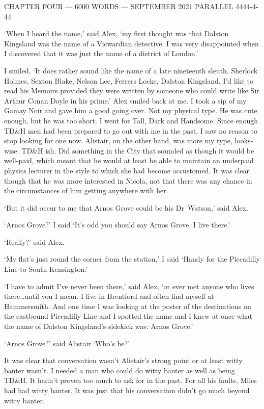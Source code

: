 {\parindent=0pt {\obeylines
{\twelvess CHAPTER FOUR --- 6000 WORDS --- SEPTEMBER 2021}
{\twelvess PARALLEL 4444-4-44}}
\vskip 1cm

\twelverm
`When I heard the name,' said Alex, `my first thought was that
Dalston Kingsland was the name of a Vicwardian detective. I was very
disappointed when I discovered that it was just the name of a
district of London.'}

I smiled. `It does rather sound like the name of a late nineteenth
sleuth. Sherlock Holmes, Sexton Blake, Nelson Lee, Ferrers Locke,
Dalston Kingsland. I'd like to read his {\twelvesl Memoirs\/}
provided they were written by someone who could write like Sir
Arthur Conan Doyle in his prime.' Alex smiled back at me. I took a
sip of my Gamay Noir and gave him a good going over. Not my physical
type. He was cute enough, but he was too short. I went for Tall,
Dark and Handsome. Since enough TD{\&}H men had been prepared to go
out with me in the past, I saw no reason to stop looking for one
now. Alistair, on the other hand, was more my type, looks-wise.
TD{\&}H {\twelveit ish}. Did something in the City that sounded as
though it would be well-paid, which meant that he would at least be
able to maintain an underpaid physics lecturer in the style to which
she had become accustomed. It was clear though that he was more interested in Nicola, not that there was any chance in the circumstances of him getting anywhere with her.

`But it did occur to me that Arnos Grove could be his Dr~Watson,'
said Alex.

`Arnos Grove?' I said `It's odd you should say Arnos Grove. I live
there.'

`Really?' said Alex.

`My flat's just round the corner from the station,' I said `Handy
for the Piccadilly Line to South Kensington.'

`I have to admit I've never been there,' said Alex, `or ever met
anyone who lives there\dots until you I mean. I live in Brentford
and often find myself at Hammersmith. And one time I was looking at
the poster of the destinations on the eastbound Piccadilly Line and
I spotted the name and I knew at once what the name of Dalston
Kingsland's sidekick was: Arnos Grove.'

`Arnos Grove?' said Alistair `Who's he?'

It was clear that conversation wasn't Alistair's
strong point or at least witty banter wasn't. I needed a man who
could do witty banter as well as being TD{\&}H. It
hadn't proven too much to ask for in the past. For all his faults,
Miles had had witty banter. It was just that his conversation didn't
go much beyond witty banter.

